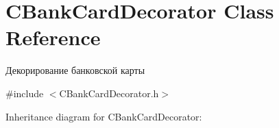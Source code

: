 \hypertarget{classCBankCardDecorator}{}\section{C\+Bank\+Card\+Decorator Class Reference}
\label{classCBankCardDecorator}


Декорирование банковской карты  




{\ttfamily \#include $<$C\+Bank\+Card\+Decorator.\+h$>$}



Inheritance diagram for C\+Bank\+Card\+Decorator\+:

